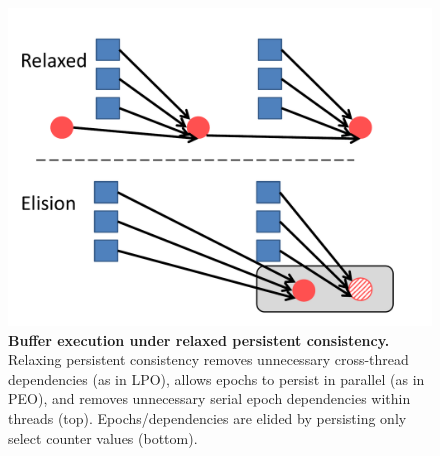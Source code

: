 \begin{figure}
\centering
\includegraphics[width=.7\textwidth]{PMC_patterns/buffer_relaxed_elision.pdf}
\caption{\textbf{Buffer execution under relaxed persistent consistency.}  Relaxing persistent consistency removes unnecessary cross-thread dependencies (as in LPO), allows epochs to persist in parallel (as in PEO), and removes unnecessary serial epoch dependencies within threads (top).  Epochs/dependencies are elided by persisting only select counter values (bottom).}
\label{fig:buffer_relaxed_elision}
\end{figure}
